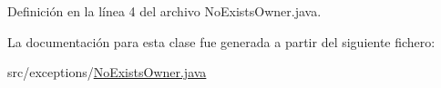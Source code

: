 Definición en la línea 4 del archivo No\+Exists\+Owner.\+java.


\begin{DoxyCode}{0}

\end{DoxyCode}


La documentación para esta clase fue generada a partir del siguiente fichero\+:\begin{DoxyCompactItemize}
\item 
src/exceptions/\mbox{\hyperlink{_no_exists_owner_8java}{No\+Exists\+Owner.\+java}}\end{DoxyCompactItemize}
